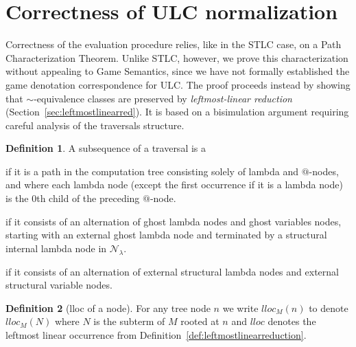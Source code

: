 \documentclass{elsarticle}
\makeatletter
\theoremstyle{plain}
\theoremstyle{definition}
\newtheorem{definition}{Definition}[section]
\theoremstyle{remark}
\newcommand\Nodes{\mathcal{N}}%
\newcommand\NodesLmd{\Nodes_\lambda}%
\renewcommand\ie{{\it i.e.\@\xspace}}
\makeatother
\begin{document}
\section{Correctness of ULC normalization}
\label{sec:correctness_ulc_normalization}
Correctness of the evaluation procedure relies, like in the STLC case, on a Path Characterization Theorem.
Unlike STLC, however, we prove this characterization without appealing to Game Semantics, since we have not formally established the game denotation correspondence for ULC.
The proof proceeds instead by showing that $\sim$-equivalence classes are preserved by \emph{leftmost-linear reduction} (Section~\ref{sec:leftmostlinearred}). It is based on a bisimulation argument requiring careful analysis of the traversals structure.


\begin{definition}
    \label{def:spinaldescent_pendingarglookup}
A subsequence of a traversal is a
\begin{enumerate*}[nosep,label=(\roman*)]
\item {} if it is a path in the computation tree consisting solely of lambda and $@$-nodes, and where each lambda node (except the first occurrence if it is a lambda node) is the $0$th child of the preceding $@$-node.
\item {} if it consists of an alternation of ghost lambda nodes and ghost variables nodes, starting with an external ghost lambda node and terminated by a structural internal lambda node in $\NodesLmd$.
\item {} if it consists of an alternation of external structural lambda nodes and external structural variable nodes.
\end{enumerate*}
\end{definition}

\begin{definition}[lloc of a node]
For any tree node $n$ we write $lloc_M(n)$ to denote $lloc_M(N)$ where $N$ is the subterm of $M$ rooted at $n$ and $lloc$ denotes the leftmost linear occurrence from Definition~\ref{def:leftmostlinearreduction}.
\end{definition}
\end{document}
